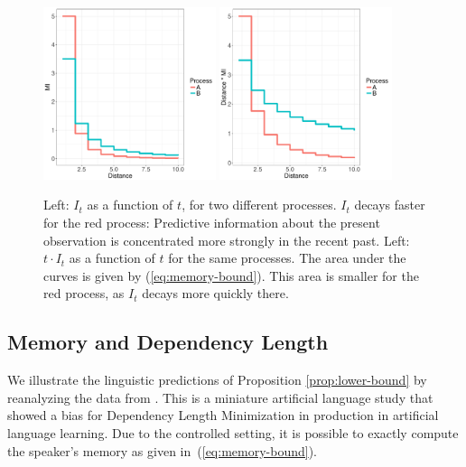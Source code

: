 \documentclass[11pt,letterpaper]{article}
\begin{document}
\begin{figure}
\includegraphics[width=0.45\textwidth]{toy/decay.pdf}
\includegraphics[width=0.45\textwidth]{toy/memory.pdf}
%
	\caption{Left: $I_t$ as a function of $t$, for two different processes. $I_t$ decays faster for the red process: Predictive information about the present observation is concentrated more strongly in the recent past. Left: $t \cdot I_t$ as a function of $t$ for the same processes. The area under the curves is given by (\ref{eq:memory-bound}). This area is smaller for the red process, as $I_t$ decays more quickly there.   }\label{fig:basic}
\end{figure}


\subsection{Memory and Dependency Length}




We illustrate the linguistic predictions of Proposition \ref{prop:lower-bound} by reanalyzing the data from \cite{fedzechkina-human-2017}.
This is a miniature artificial language study that showed a bias for Dependency Length Minimization in production in artificial language learning.
Due to the controlled setting, it is possible to exactly compute the speaker's memory as given in~(\ref{eq:memory-bound}).
\end{document}
